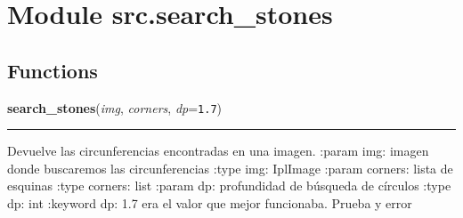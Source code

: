 %
%
%


\section{Module src.search\_stones}

    \label{src:search_stones}


  \subsection{Functions}

    \label{src:search_stones:search_stones}

    \vspace{0.5ex}

\hspace{.8\funcindent}\begin{boxedminipage}{\funcwidth}

    \raggedright \textbf{search\_stones}(\textit{img}, \textit{corners}, \textit{dp}={\tt 1.7})

    \vspace{-1.5ex}

    \rule{\textwidth}{0.5\fboxrule}
\setlength{\parskip}{2ex}
    Devuelve las circunferencias encontradas en una imagen. :param img: 
    imagen donde buscaremos las circunferencias :type img: IplImage :param 
    corners: lista de esquinas :type corners: list :param dp: profundidad 
    de búsqueda de círculos :type dp: int :keyword dp: 1.7 era el valor que
    mejor funcionaba. Prueba y error

\setlength{\parskip}{1ex}
    \end{boxedminipage}

